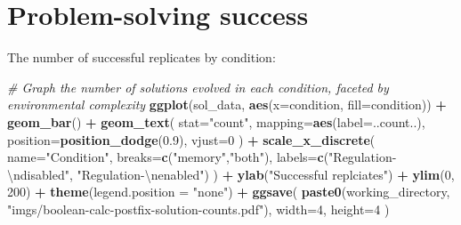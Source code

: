 \documentclass[
]{book}
\newenvironment{Shaded}{\begin{snugshade}}{\end{snugshade}}
\newcommand{\CharTok}[1]{\textcolor[rgb]{0.31,0.60,0.02}{#1}}
\newcommand{\CommentTok}[1]{\textcolor[rgb]{0.56,0.35,0.01}{\textit{#1}}}
\newcommand{\DataTypeTok}[1]{\textcolor[rgb]{0.13,0.29,0.53}{#1}}
\newcommand{\DecValTok}[1]{\textcolor[rgb]{0.00,0.00,0.81}{#1}}
\newcommand{\FloatTok}[1]{\textcolor[rgb]{0.00,0.00,0.81}{#1}}
\newcommand{\KeywordTok}[1]{\textcolor[rgb]{0.13,0.29,0.53}{\textbf{#1}}}
\newcommand{\NormalTok}[1]{#1}
\newcommand{\OperatorTok}[1]{\textcolor[rgb]{0.81,0.36,0.00}{\textbf{#1}}}
\newcommand{\StringTok}[1]{\textcolor[rgb]{0.31,0.60,0.02}{#1}}
\begin{document}
\begin{Shaded}
\end{Shaded}

\hypertarget{problem-solving-success-3}{%
\section{Problem-solving success}\label{problem-solving-success-3}}

The number of successful replicates by condition:

\begin{Shaded}
\begin{Highlighting}[]
\CommentTok{\# Graph the number of solutions evolved in each condition, faceted by environmental complexity}
\KeywordTok{ggplot}\NormalTok{(sol\_data, }\KeywordTok{aes}\NormalTok{(}\DataTypeTok{x=}\NormalTok{condition, }\DataTypeTok{fill=}\NormalTok{condition)) }\OperatorTok{+}
\StringTok{  }\KeywordTok{geom\_bar}\NormalTok{() }\OperatorTok{+}
\StringTok{  }\KeywordTok{geom\_text}\NormalTok{(}
    \DataTypeTok{stat=}\StringTok{"count"}\NormalTok{,}
    \DataTypeTok{mapping=}\KeywordTok{aes}\NormalTok{(}\DataTypeTok{label=}\NormalTok{..count..),}
    \DataTypeTok{position=}\KeywordTok{position\_dodge}\NormalTok{(}\FloatTok{0.9}\NormalTok{),}
    \DataTypeTok{vjust=}\DecValTok{0}
\NormalTok{  ) }\OperatorTok{+}
\StringTok{  }\KeywordTok{scale\_x\_discrete}\NormalTok{(}
    \DataTypeTok{name=}\StringTok{"Condition"}\NormalTok{,}
    \DataTypeTok{breaks=}\KeywordTok{c}\NormalTok{(}\StringTok{"memory"}\NormalTok{,}\StringTok{"both"}\NormalTok{),}
    \DataTypeTok{labels=}\KeywordTok{c}\NormalTok{(}\StringTok{"Regulation{-}}\CharTok{\textbackslash{}n}\StringTok{disabled"}\NormalTok{, }\StringTok{"Regulation{-}}\CharTok{\textbackslash{}n}\StringTok{enabled"}\NormalTok{)}
\NormalTok{  ) }\OperatorTok{+}
\StringTok{  }\KeywordTok{ylab}\NormalTok{(}\StringTok{"Successful replciates"}\NormalTok{) }\OperatorTok{+}
\StringTok{  }\KeywordTok{ylim}\NormalTok{(}\DecValTok{0}\NormalTok{, }\DecValTok{200}\NormalTok{) }\OperatorTok{+}
\StringTok{  }\KeywordTok{theme}\NormalTok{(}\DataTypeTok{legend.position =} \StringTok{"none"}\NormalTok{) }\OperatorTok{+}
\StringTok{  }\KeywordTok{ggsave}\NormalTok{(}
    \KeywordTok{paste0}\NormalTok{(working\_directory, }\StringTok{"imgs/boolean{-}calc{-}postfix{-}solution{-}counts.pdf"}\NormalTok{),}
    \DataTypeTok{width=}\DecValTok{4}\NormalTok{,}
    \DataTypeTok{height=}\DecValTok{4}
\NormalTok{  )}
\end{Highlighting}
\end{Shaded}
\end{document}
